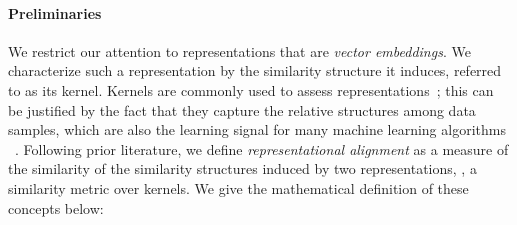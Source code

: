 \documentclass{article}
\theoremstyle{plain}
\theoremstyle{definition}
\theoremstyle{remark}
\begin{document}
\paragraph{Preliminaries}
We restrict our attention to representations that are \textit{vector embeddings}. We characterize such a representation by the similarity structure it induces, referred to as its kernel. Kernels are commonly used to assess representations~\cite{kornblith2019similarity, klabunde2023similarity}; this can be justified by the fact that they capture the relative structures among data samples, which are also the learning signal for many machine learning algorithms ~\cite{aronszajn1950theory,smola1998learning}. Following prior literature, we define \textit{representational alignment} as a measure of the similarity of the similarity structures induced by two representations, \ie, a similarity metric over kernels.
We give the mathematical definition of these concepts below:
\end{document}
